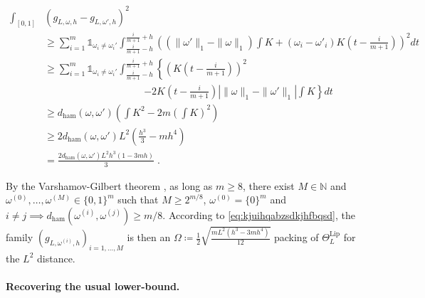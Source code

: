 \documentclass[10pt]{article} %
\def\Ind{\mathds{1}}
\newcommand{\N}[0]{\mathbb{N}}
\newcommand\ham[2]{d_\mathrm{ham}\left( {#1}, {#2} \right)}
\newcommand\p[1]{\left( {#1}\right)}
\newcommand\RG[1]{\textcolor{red}{#1}}
\newcommand\mRG[1]{\marginpar{\tiny\RG{#1}}}
\begin{document}
\begin{equation}
\label{eq:kjuihqabzsdkjhfbqsd}
\begin{aligned}
    \int_{[0, 1]} &\p{g_{L, \omega, h} - g_{L, \omega', h}}^2 \\
    &\geq 
    \sum_{i=1}^m \Ind_{\omega_i \neq \omega_i'} \int_{\frac{i}{m+1} - h}^{\frac{i}{m+1} + h}
    \p{\p{\| \omega' \|_1 - \| \omega \|_1} \int K +(\omega_i-\omega'_i)  K\p{t-\frac{i}{m+1} }}^2 dt\\
    &\geq
    \sum_{i=1}^m \Ind_{\omega_i \neq \omega_i'} \int_{\frac{i}{m+1} - h}^{\frac{i}{m+1} + h}
    \left\{\p{K\p{t-\frac{i}{m+1}}}^2 \right.\\
    &\quad\quad\quad\quad\quad\quad\quad\quad\quad\quad \left.- 2 K\p{t-\frac{i}{m+1}} \left|\| \omega \|_1 - \| \omega' \|_1\right| \int K \right\} dt\\ 
    &\geq
    \ham{\omega}{\omega '} \p{  \int K^2 - 2m \p{\int K}^2} \\
    &\geq
    2 \ham{\omega}{\omega '} L^2 \p{  \frac{h^3}{3} - m h^4} \\
    &= \frac{2 \ham{\omega}{\omega'} L^2 h^3\p{1- 3 mh}}{3}\;.
\end{aligned}
\end{equation}

By the Varshamov-Gilbert theorem \citep[Lemma 2.7]{tsybakov2003introduction}, as long as $m \geq 8$, there exist $M \in \N$ and $\omega^{(0)}, \dots, \omega^{(M)} \in \{ 0, 1 \}^m$ such that $M \geq 2^{m/8}$, $\omega^{(0)} = \{0\}^m$ and $i \neq j \implies \ham{\omega^{(i)}}{\omega^{(j)}} \geq m/8$. According to \eqref{eq:kjuihqabzsdkjhfbqsd}, the family $\p{g_{L, \omega^{(i)}, h}}_{i=1, \dots, M}$ is then %
an $\Omega \coloneqq \frac{1}{2} \sqrt{\frac{mL^2\p{h^3 - 3 mh^4}}{12}}$ packing of $\Theta^{\text{Lip}}_L$ for the $L^2$ distance.

\paragraph{Recovering the usual lower-bound.}
\end{document}
